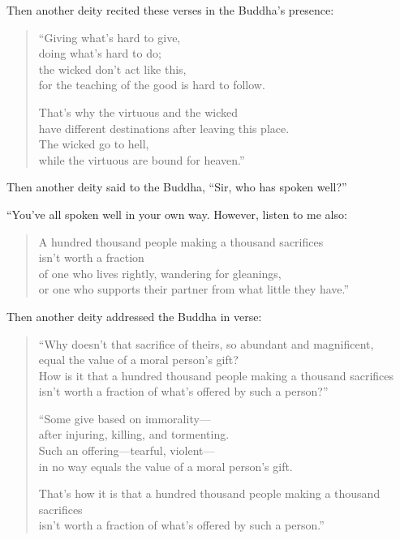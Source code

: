 \documentclass[12pt,openany]{book}%
\begin{document}
Then another deity recited these verses in the Buddha’s presence: 

\begin{verse}%
“Giving what’s hard to give, \\
doing what’s hard to do; \\
the wicked don’t act like this, \\
for the teaching of the good is hard to follow. 

That’s why the virtuous and the wicked \\
have different destinations after leaving this place. \\
The wicked go to hell, \\
while the virtuous are bound for heaven.” 

%
\end{verse}

Then another deity said to the Buddha, “Sir, who has spoken well?” 

“You’ve all spoken well in your own way. However, listen to me also: 

\begin{verse}%
A hundred thousand people making a thousand sacrifices \\
isn’t worth a fraction \\
of one who lives rightly, wandering for gleanings, \\
or one who supports their partner from what little they have.” 

%
\end{verse}

Then another deity addressed the Buddha in verse: 

\begin{verse}%
“Why doesn’t that sacrifice of theirs, so abundant and magnificent, \\
equal the value of a moral person’s gift? \\
How is it that a hundred thousand people making a thousand sacrifices \\
isn’t worth a fraction of what’s offered by such a person?” 

“Some give based on immorality—\\
after injuring, killing, and tormenting. \\
Such an offering—tearful, violent—\\
in no way equals the value of a moral person’s gift. 

That’s how it is that a hundred thousand people making a thousand sacrifices \\
isn’t worth a fraction of what’s offered by such a person.” 

%
\end{verse}
\end{document}
